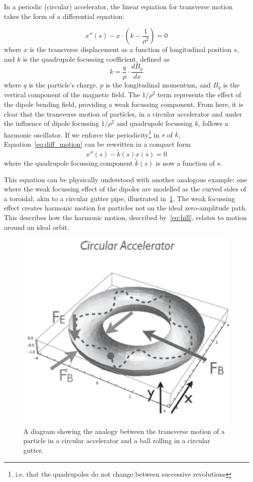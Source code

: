 \documentclass[11pt]{report}
\begin{document}
In a periodic (circular) accelerator, the linear equation for transverse motion takes the form of a differential equation:

\begin{equation}
  x''(s)-x\cdot\left(k-\frac{1}{\rho^2}\right)=0
  \label{eq:diff_motion}
\end{equation} 
where $x$ is the transverse displacement as a function of longitudinal position $s$, and $k$ is the quadrupole focussing coefficient, defined as
\begin{equation}
  k=\frac{q}{p}\cdot\frac{dB_y}{dx}
  \label{eq:quadrupole}
\end{equation} where $q$ is the particle's charge, $p$ is the longitudinal momentum, and $B_y$ is the vertical component of the magnetic field. The $1/\rho^2$ term represents the effect of the dipole bending field, providing a weak focussing component.
From here, it is clear that the transverse motion of particles, in a circular accelerator and under the influence of dipole focussing $1/\rho^2$ and quadrupole focussing $k$, follows a harmonic oscillator. If we enforce the periodicity\footnote{i.e. that the quadrupoles do not change between successive revolutions} in $s$ of $k$, Equation~\ref{eq:diff_motion} can be rewritten in a compact form
\begin{equation}
  x''(s)-\tilde{k}(s)x(s)=0
  \label{eq:hill}
\end{equation} where the quadrupole focussing component $\tilde{k}(s)$ is now a function of $s$. 

This equation can be physically understood with another analogous example: one where the weak focussing effect of the dipoles are modelled as the curved sides of a toroidal, akin to a circular gutter pipe, illustrated in~\ref{fig:guttering}. The weak focussing effect creates harmonic motion for particles not on the ideal zero-amplitude path. This describes how the harmonic motion, described by~\autoref{eq:hill}, relates to motion around an ideal orbit.

\begin{figure}[h]
  \centering
  \includegraphics*[width=0.6\linewidth]{guttering}
  \caption{A diagram showing the analogy between the transverse motion of a particle in a circular accelerator and a ball rolling in a circular gutter.}\label{fig:guttering}
\end{figure}
\end{document}
